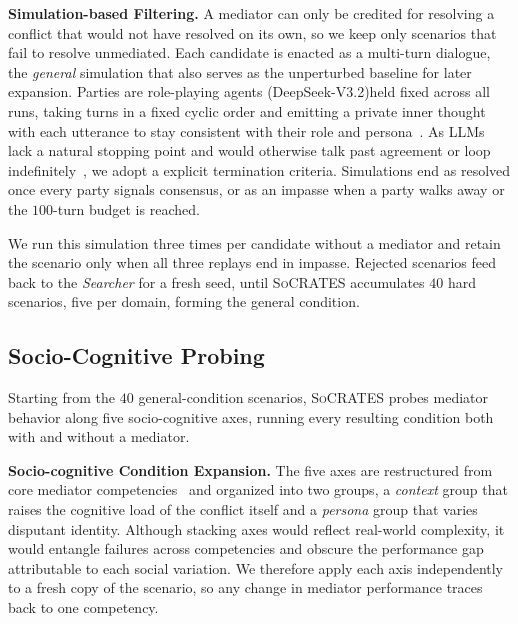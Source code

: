 \documentclass{llmxive}
\providecommand{\algname}{\textsc{SoCRATES}}
\begin{document}
\smallskip\smallskip\noindent\textbf{{Simulation-based Filtering.}}
A mediator can only be credited for resolving a conflict that would not have resolved on its own, so we keep only scenarios that fail to resolve unmediated. Each candidate is enacted as a multi-turn dialogue, the \emph{general} simulation that also serves as the unperturbed baseline for later expansion. Parties are role-playing agents (DeepSeek-V3.2)\footnotemark[1] held fixed across all runs, taking turns in a fixed cyclic order and emitting a private inner thought with each utterance to stay consistent with their role and persona~\citep{liu2025proactive, liu2025promediate}. As LLMs lack a natural stopping point and would otherwise talk past agreement or loop indefinitely~\citep{hu2026multi}, we adopt a explicit termination criteria. Simulations end as resolved once every party signals consensus, or as an impasse when a party walks away or the $100$-turn budget is reached.


We run this simulation three times per candidate without a mediator and retain the scenario only when all three replays end in impasse. Rejected scenarios feed back to the \textit{Searcher} for a fresh seed, until \algname{} accumulates $40$ hard scenarios, five per domain, forming the general condition.

\subsection{Socio-Cognitive Probing}
\label{sec:method:simulation}

Starting from the $40$ general-condition scenarios, \algname{} probes mediator behavior along five socio-cognitive axes, running every resulting condition both with and without a mediator.

\smallskip\smallskip\noindent\textbf{{Socio-cognitive Condition Expansion.}}
The five axes are restructured from core mediator competencies~\citep{susskind1999consensus,bowling2000bringing,lebaron2003bridging} and organized into two groups, a \emph{context} group that raises the cognitive load of the conflict itself and a \emph{persona} group that varies disputant identity. Although stacking axes would reflect real-world complexity, it would entangle failures across competencies and obscure the performance gap attributable to each social variation. We therefore apply each axis independently to a fresh copy of the scenario, so any change in mediator performance traces back to one competency. 
\end{document}
